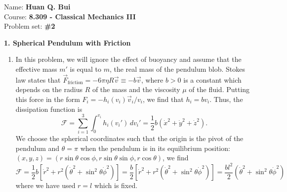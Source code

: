\documentclass{article}
\theoremstyle{definition}
\newcommand{\f}[2]{\frac{#1}{#2}}
\newcommand{\lb}{\left[}
\newcommand{\rb}{\right]}
\begin{document}
\begin{framed}
	\noindent Name: \textbf{Huan Q. Bui}\\
	Course: \textbf{8.309 - Classical Mechanics III}\\
	Problem set: \textbf{\#2}
\end{framed}
	
	
\noindent \textbf{1. Spherical Pendulum with Friction}
\begin{enumerate}[label = (\alph*)]
	\item In this problem, we will ignore the effect of buoyancy and assume that the effective mass $m'$ is equal to $m$, the real mass of the pendulum blob. Stokes law states that $\vec{F}_\text{friction} = -6\pi \eta R\vec{v} \equiv -b\vec{v}$, where $b>0$ is a constant which depends on the radius $R$ of the mass and the viscosity $\mu$ of the fluid. Putting this force in the form $F_i = -h_i(v_i) \vec{v}_i/v_i$, we find that $h_i = b v_i$. Thus, the dissipation function is 
	\begin{equation*}
	\mathcal{F} = \sum_{i=1}^3  \int_0^{v_i}h_i(v_i') \,dv_i' = \f{1}{2}b(\dot{x}^2+\dot{y}^2+\dot{z}^2).
	\end{equation*}
	We choose the spherical coordinates such that the origin is the pivot of the pendulum and $\theta = \pi$ when the pendulum is in its equilibrium position: $(x,y,z) = (r\sin\theta\cos\phi, r\sin\theta\sin\phi,r\cos\theta)$, we find 
	\begin{equation*}
	\mathcal{F} = \f{1}{2}b\lb \dot{r}^2 + r^2(\dot{\theta}^2 + \sin^2\theta \dot{\phi}^2) \rb = 
	\f{b}{2}\lb \dot{r}^2 + r^2(\dot{\theta}^2 + \sin^2\theta \dot{\phi}^2) \rb = 
	\boxed{\f{bl^2}{2}(\dot{\theta}^2 + \sin^2\theta \dot{\phi}^2)}
	\end{equation*}
	where we have used $r=l$ which is fixed. 
	

\end{enumerate}
\end{document}
